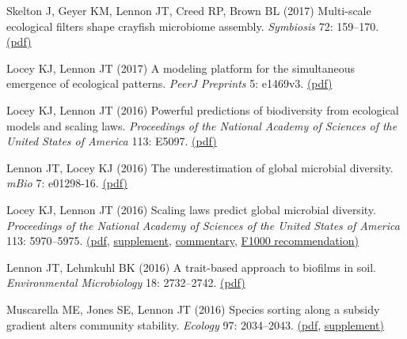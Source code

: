 \documentclass[11pt]{article}
\begin{document}
\begin{etaremune}
\item Skelton J, Geyer KM, Lennon JT, Creed RP, Brown BL (2017) Multi-scale ecological filters shape crayfish microbiome assembly. \textit{Symbiosis} 72: 159–170. \href{https://lennonlab.github.io/assets/publications/Skelton_etal_2017.pdf}{(pdf)}

\item Locey KJ, Lennon JT (2017) A modeling platform for the simultaneous emergence of ecological patterns. \textit{PeerJ Preprints} 5: e1469v3. \href{https://lennonlab.github.io/assets/publications/Locey_Lennon_2017.pdf}{(pdf)}

\item Locey KJ, Lennon JT (2016) Powerful predictions of biodiversity from ecological models and scaling laws. \textit{Proceedings of the National Academy of Sciences of the United States of America} 113: E5097. \href{https://lennonlab.github.io/assets/publications/Locey_Lennon_2016_Reply.pdf}{(pdf)}

\item Lennon JT, Locey KJ (2016) The underestimation of global microbial diversity. \textit{mBio} 7: e01298-16. \href{https://lennonlab.github.io/assets/publications/Lennon_Locey_2016_mBio.pdf}{(pdf)}

\item Locey KJ, Lennon JT (2016) Scaling laws predict global microbial diversity. \textit{Proceedings of the National Academy of Sciences of the United States of America} 113: 5970–5975. \href{https://lennonlab.github.io/assets/publications/Locey_Lennon_2016.pdf}{(pdf}, \href{https://lennonlab.github.io/assets/publications/Locey_Lennon_2016_SI.pdf}{supplement}, \href{https://lennonlab.github.io/assets/publications/Pedros-Alio_Manrubia_2016.pdf}{commentary}, \href{https://f1000.com/prime/726327633}{F1000 recommendation)}

\item Lennon JT, Lehmkuhl BK (2016) A trait-based approach to biofilms in soil. \textit{Environmental Microbiology} 18: 2732–2742. \href{https://lennonlab.github.io/assets/publications/Lennon_Lehmkuhl_2016.pdf}{(pdf)}

\item Muscarella ME, Jones SE, Lennon JT (2016) Species sorting along a subsidy gradient alters community stability. \textit{Ecology} 97: 2034–2043. \href{https://lennonlab.github.io/assets/publications/Muscarella_etal_2016.pdf}{(pdf}, \href{https://lennonlab.github.io/assets/publications/Muscarella_etal_Supplement_2016.pdf}{supplement)}


\end{etaremune}
\end{document}
